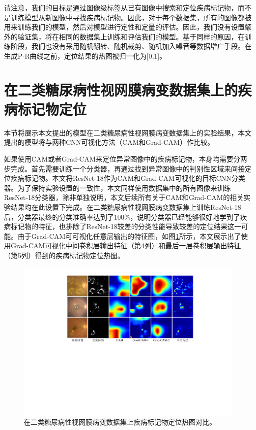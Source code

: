 请注意，我们的目标是通过图像级标签从已有图像中搜索和定位疾病标记物，而不是训练模型从新图像中寻找疾病标记物。因此，对于每个数据集，所有的图像都被用来训练我们的模型，然后对模型进行定性和定量的评估。因此，我们没有设置额外的验证集，将在相同的数据集上训练和评估我们的模型。基于同样的原因，在训练阶段，我们也没有采用随机翻转、随机裁剪、随机加入噪音等数据增广手段。在生成P-R曲线之前，定位结果的热图被归一化为[0,1]。

\section{在二类糖尿病性视网膜病变数据集上的疾病标记物定位}\label{sec:bin_dr_ds_experiment}
本节将展示本文提出的模型在二类糖尿病性视网膜病变数据集上的实验结果，本文提出的模型将与两种CNN可视化方法（CAM和Grad-CAM）作比较。

如果使用CAM或者Grad-CAM来定位异常图像中的疾病标记物，本身均需要分两步完成。首先需要训练一个分类器，再通过找到异常图像中的判别性区域来间接定位疾病标记物。本文将ResNet-18作为CAM和Grad-CAM可视化的目标CNN分类器。为了保持实验设置的一致性，本文同样使用数据集中的所有图像来训练ResNet-18分类器，除非单独说明，本文后续所有关于CAM和Grad-CAM的相关实验结果均在此设置下完成。在二类糖尿病性视网膜病变数据集上训练ResNet-18后，分类器最终的分类准确率达到了100$\%$，说明分类器已经能够很好地学到了疾病标记物的特征，也排除了ResNet-18较差的分类性能导致较差的定位结果这一可能。由于Grad-CAM可可视化任意层输出的特征图，如图\ref{fig:retinal_image_res}所示，本文展示出了使用Grad-CAM可视化中间卷积层输出特征（第4列）和最后一层卷积层输出特征（第5列）得到的疾病标记物定位热图。
\begin{figure}[h]
	\centering
	\includegraphics[width=1.0\textwidth]{figure/retinal_image_res.pdf}
	\caption[在二类糖尿病性视网膜病变数据集上疾病标记物定位热图对比]{在二类糖尿病性视网膜病变数据集上疾病标记物定位热图对比。}
	\label{fig:retinal_image_res}
\end{figure}

